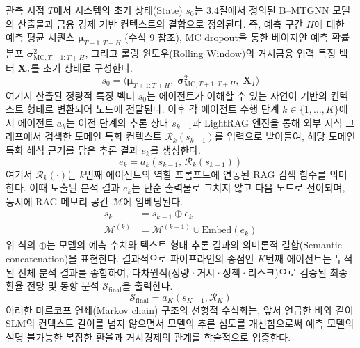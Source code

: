 관측 시점 $T$에서 시스템의 초기 상태(State) $s_0$는 3.4절에서 정의된 B--MTGNN 모델의 산출물과 금융 경제 기반 컨텍스트의 결합으로 정의된다. 즉, 예측 구간 $H$에 대한 예측 평균 시퀀스 $\boldsymbol{\mu}_{T+1:T+H}$ (수식 9 참조), MC dropout을 통한 베이지안 예측 확률 분포 $\boldsymbol{\sigma}^2_{\mathrm{MC}, T+1:T+H}$, 그리고 롤링 윈도우(Rolling Window)의 거시금융 입력 특징 벡터 $\mathbf{X}_{T}$를 초기 상태로 구성한다.
\setcounter{equation}{10}
\begin{equation}
s_0 = \big\langle \boldsymbol{\mu}_{T+1:T+H}, \; \boldsymbol{\sigma}^2_{\mathrm{MC}, T+1:T+H}, \; \mathbf{X}_{T} \big\rangle
\end{equation}
여기서 산출된 정량적 특징 벡터 $s_0$는 에이전트가 이해할 수 있는 자연어 기반의 컨텍스트 형태로 변환되어 노드에 전달된다. 이후 각 에이전트 수행 단계 $k \in \{1, \dots, K\}$에서 에이전트 $a_k$는 이전 단계의 추론 상태 $s_{k-1}$과 LightRAG 엔진을 통해 외부 지식 그래프에서 검색한 도메인 특화 컨텍스트 $\mathcal{R}_k(s_{k-1})$를 입력으로 받아들여, 해당 도메인 특화 해석 근거를 담은 추론 결과 $e_k$를 생성한다.
\begin{equation}
e_k = a_k\!\left(s_{k-1}, \, \mathcal{R}_k(s_{k-1})\right)
\end{equation}
여기서 $\mathcal{R}_k(\cdot)$는 $k$번째 에이전트의 역할 프롬프트에 연동된 RAG 검색 함수를 의미한다. 이때 도출된 분석 결과 $e_k$는 단순 출력물로 그치지 않고 다음 노드로 전이되며, 동시에 RAG 메모리 공간 $\mathcal{M}$에 임베딩된다.
\begin{equation}
\begin{aligned}
s_k &= s_{k-1} \oplus e_k \\
\mathcal{M}^{(k)} &= \mathcal{M}^{(k-1)} \cup \text{Embed}(e_k)
\end{aligned}
\end{equation}
위 식의 $\oplus$는 모델의 예측 수치와 텍스트 형태 추론 결과의 의미론적 결합(Semantic concatenation)을 표현한다.
결과적으로 파이프라인의 종점인 $K$번째 에이전트는 누적된 전체 분석 결과를 종합하여, 다차원적(정량·거시·정책·리스크)으로 검증된 최종 환율 전망 및 동향 분석 $\mathcal{S}_{\text{final}}$을 출력한다.
\begin{equation}
\mathcal{S}_{\text{final}} = a_K(s_{K-1}, \mathcal{R}_K)
\end{equation}
이러한 마르코프 연쇄(Markov chain) 구조의 선형적 수식화는, 앞서 언급한 바와 같이 SLM의 컨텍스트 길이를 넘지 않으면서 모델의 추론 심도를 개선함으로써 예측 모델의 설명 불가능한 복잡한 환율과 거시경제의 관계를 학술적으로 입증한다.
